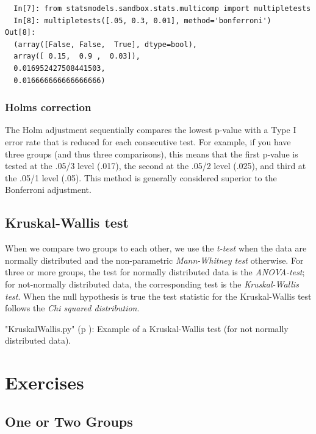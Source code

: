 \begin{lstlisting}
  In[7]: from statsmodels.sandbox.stats.multicomp import multipletests
  In[8]: multipletests([.05, 0.3, 0.01], method='bonferroni')
Out[8]:
  (array([False, False,  True], dtype=bool),
  array([ 0.15,  0.9 ,  0.03]),
  0.016952427508441503,
  0.016666666666666666)
\end{lstlisting}

\subsubsection{Holms correction}

The Holm adjustment sequentially compares the lowest p-value with a Type I error rate that is reduced for each consecutive test. For example, if you have three groups (and thus three comparisons), this means that the first p-value is tested at the .05/3 level (.017), the second at the .05/2 level (.025), and third at the .05/1 level (.05). This method is generally considered superior to the Bonferroni adjustment.

\subsection{Kruskal-Wallis test}\label{test:Kruskal-Wallis}

When we compare two groups to each other, we use the \emph{t-test} when the data are normally distributed and the non-parametric \emph{Mann-Whitney test} otherwise. For three or more groups, the test for normally distributed data is the \emph{ANOVA-test}; for not-normally distributed data, the corresponding test is the \emph{Kruskal-Wallis test}. When the null hypothesis is true the test statistic for the Kruskal-Wallis test follows the \emph{Chi squared distribution}.

\PyImg "KruskalWallis.py" (p \pageref{py:KruskalWallis}): Example of a Kruskal-Wallis test (for not normally distributed data).

\section{Exercises}

\subsection{One or Two Groups}

